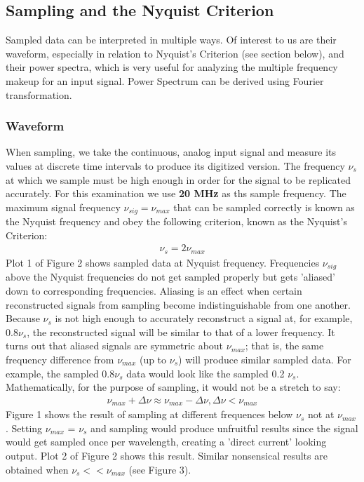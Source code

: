 \documentclass[12pt]{article}
\begin{document}
\subsection{Sampling and the Nyquist Criterion}
Sampled data can be interpreted in multiple ways. Of interest to us are
their waveform, especially in relation to Nyquist's Criterion (see
section below), and their power spectra, which is very useful for
analyzing the multiple frequency makeup for an input signal. Power
Spectrum can be derived using Fourier transformation.
\subsubsection{Waveform}
When sampling, we take the continuous, analog input signal and measure
its values at discrete time intervals to produce its digitized
version. The frequency $\nu_{s}$ at which we sample must be high enough
in order for the signal to be replicated accurately. For this
examination we use \textbf{20 MHz} as ths sample frequency. The maximum
signal frequency $\nu_{sig} = \nu_{max}$ that can be sampled correctly is 
known as the Nyquist frequency and obey the following criterion, known 
as the Nyquist's Criterion:
\begin{align}\nu_{s} = 2\nu_{max}\end{align}
Plot 1 of Figure 2 shows sampled data at Nyquist frequency. Frequencies
$\nu_{sig}$ above the Nyquist frequencies do not get sampled
properly but gets 'aliased' down to corresponding frequencies. Aliasing
is an effect when certain reconstructed signals from sampling become
indistinguishable from one another. Because $\nu_{s}$ is not high enough
to accurately reconstruct a signal at, for example, 0.8$\nu_{s}$, the
reconstructed signal will be similar to that of a lower frequency. It
turns out that aliased signals are symmetric about $\nu_{max}$; that is, 
the same frequency difference from $\nu_{max}$ (up to $\nu_{s}$) will produce
similar sampled data. For example, the sampled 0.8$\nu_{s}$ data would
look like the sampled 0.2 $\nu_{s}$. Mathematically, for the purpose of
sampling, it would not be a stretch to say:
\begin{align}\nu_{max} + \Delta{\nu} \approx \nu_{max} - \Delta{\nu} , \Delta{\nu}
  < \nu_{max}\end{align}
Figure 1 shows the result of sampling at different frequences below
$\nu_{s}$ not at $\nu_{max}$. Setting $\nu_{max}$ = $\nu_{s}$ and sampling would 
produce unfruitful results since the signal would get sampled once per 
wavelength, creating a 'direct current' looking output. Plot 2 of Figure
2 shows this result. Similar nonsensical results are obtained when
$\nu_{s} << \nu_{max}$ (see Figure 3).
\end{document}
